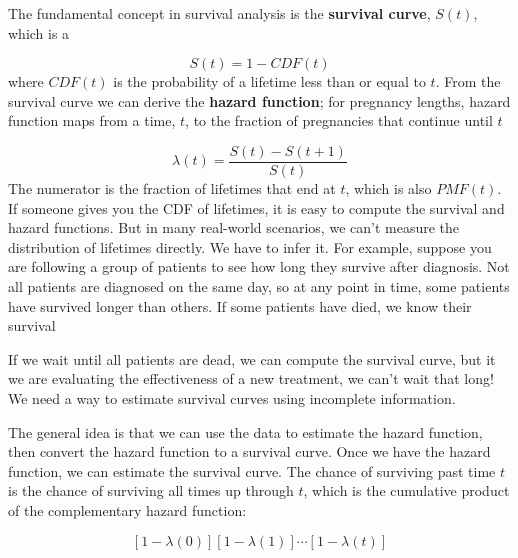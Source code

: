 \documentclass[a4paper,11pt]{article}
\begin{document}
The fundamental concept in survival analysis is the \textbf{survival curve}, $S(t)$, which is a %

\begin{equation}
\label{eq:s}
S(t) = 1 - CDF(t)
\end{equation}
where $CDF(t)$ is the probability of a lifetime less than or equal to $t$.
From the survival curve we can derive the \textbf{hazard function}; for pregnancy lengths, %
hazard function maps from a time, $t$, to the fraction of pregnancies that continue until $t$ %

\begin{equation}
\label{eq:hazard}
\lambda(t) = \frac{ S(t) - S(t+1)}{S(t)}
\end{equation}
The numerator is the fraction of lifetimes that end at $t$, which is also $PMF(t)$.
If someone gives you the CDF of lifetimes, it is easy to compute the survival and hazard functions. But in many real-world scenarios, we can't measure the distribution of lifetimes directly. We have to infer it.
For example, suppose you are following a group of patients to see how long they survive after diagnosis. Not all patients are diagnosed on the same day, so at any point in time, some patients have survived longer than others. If some patients have died, we know their survival %

If we wait until all patients are dead, we can compute the survival curve, but it we are evaluating the effectiveness of a new treatment, we can't wait that long! We need a way to estimate survival curves using incomplete information. 


The general idea is that we can use the data to estimate the hazard function, then convert the hazard function to a survival curve. 
Once we have the hazard function, we can estimate the survival curve. The chance of surviving past time $t$ is the chance of surviving all times up through $t$, which is the cumulative product of the complementary hazard function:

\begin{equation}
\label{eq:hazardtosurvival}
[ 1 - \lambda(0)][1 - \lambda(1)] \cdots [1 - \lambda(t)]
\end{equation}
\end{document}
